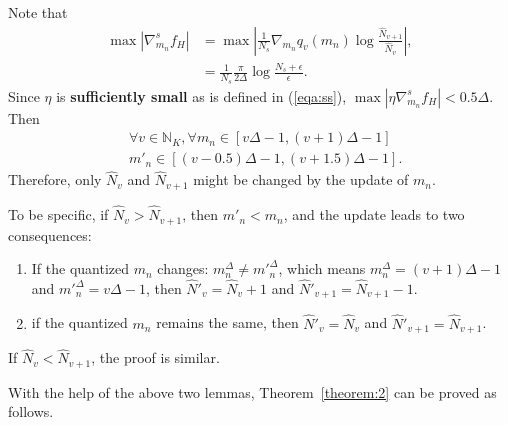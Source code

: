 \documentclass[10pt,journal,compsoc]{IEEEtran}
\begin{document}
\begin{IEEEproof}
Note that
\begin{equation}
\begin{split}
    \max\left|\nabla^s_{m_n} f_H\right| &= \max\left|\frac{1}{N_s}\nabla_{m_n} q_v(m_n)\log\frac{\hat{N}_{v+1}}{\hat{N}_{v}}\right|, \\
    &= \frac{1}{N_s} \frac{\pi}{2\Delta} \log\frac{N_s+\epsilon}{\epsilon}.
\end{split}
\end{equation}
Since $\eta$ is \textbf{sufficiently small} as is defined in (\ref{eqa:ss}),  $\max|\eta\nabla^s_{m_n} f_H| <0.5\Delta$. Then 
\begin{equation}
\begin{split}
    &\forall v\in \mathbb{N}_K, \forall m_n\in [v\Delta-1, (v+1)\Delta-1] \\
    &m'_n\in [(v-0.5)\Delta-1, (v+1.5)\Delta-1].
\end{split}
\end{equation}
Therefore, only $\hat{N}_v$ and $\hat{N}_{v+1}$ might be changed by the update of $m_n$. 

To be specific, if $\hat{N}_v > \hat{N}_{v+1}$, then $m'_n<m_n$, and the update leads to two consequences: 
\begin{enumerate}
    \item If the quantized $m_n$ changes: $m^{\Delta}_n \neq m'^{\Delta}_n$, which means $m^{\Delta}_n = (v+1)\Delta-1$ and $m'^{\Delta}_n = v\Delta-1$, then $\hat{N}'_v = \hat{N}_v +1 $ and  $\hat{N}'_{v+1} = \hat{N}_{v+1} - 1$.
    \item if the quantized $m_n$ remains the same, then $\hat{N}'_v = \hat{N}_v $ and $\hat{N}'_{v+1} = \hat{N}_{v+1}$. 
\end{enumerate}

If $\hat{N}_v < \hat{N}_{v+1}$, the proof is similar.
\end{IEEEproof}
With the help of the above two lemmas, Theorem~\ref{theorem:2} can be proved as follows.
\end{document}
